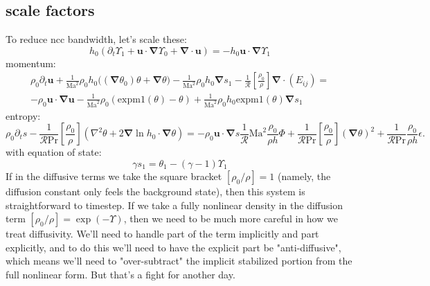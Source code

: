 \documentclass{aastex631}
\newcommand{\del}{\nabla}
\renewcommand{\vec}{\boldsymbol}
\newcommand{\grad}{\vec{\del}}
\newcommand{\scrR}{\mathcal{R}}
\newcommand{\Ma}{\mathrm{Ma}}
\renewcommand{\Pr}{\mathrm{Pr}}
\newcommand{\expm}{\mathrm{expm1}}
\begin{document}
\subsection{scale factors}
To reduce ncc bandwidth, let's scale these:
\begin{equation}
    h_0 \left(\partial_t \Upsilon_1 + \vec{u}\cdot\grad \Upsilon_0 + \grad \cdot \vec{u}\right) = - h_0 \vec{u}\cdot\grad \Upsilon_1
\end{equation}
momentum:
\begin{multline}
  \rho_0 \partial_t \vec{u}
  + \frac{1}{\Ma^2}\rho_0 h_0 \Bigg((\grad \theta_0)\theta  + \grad \theta \Bigg)
  - \frac{1}{\Ma^2} \rho_0 h_0 \grad s_1
  - \frac{1}{\scrR}\left[\frac{\rho_0}{\rho}\right] \grad \cdot (E_{ij})
  = \\
  -\rho_0 \vec{u}\cdot\grad\vec{u}
  -\frac{1}{\Ma^2} \rho_0 \left(\expm(\theta)-\theta\right)
  + \frac{1}{\Ma^2} \rho_0 h_0 \expm(\theta) \grad s_1
\end{multline}
entropy:
\begin{equation}
  \rho_0 \partial_t s
  - \frac{1}{\scrR \Pr} \left[\frac{\rho_0}{\rho}\right]\left(\nabla^2 \theta + 2 \grad \ln h_0 \cdot \grad \theta \right)
  =
  - \rho_0 \vec{u}\cdot\grad s
  \frac{1}{\scrR} \Ma^2  \frac{\rho_0}{\rho h} \Phi
  + \frac{1}{\scrR \Pr} \left[\frac{\rho_0}{\rho}\right] (\grad \theta)^2
  + \frac{1}{\scrR \Pr} \frac{\rho_0}{\rho h} \epsilon.
\end{equation}
with equation of state:
\begin{equation}
  \gamma s_1 = \theta_1 - (\gamma - 1)\Upsilon_1
\end{equation}
If in the diffusive terms we take the square bracket $[\rho_0/\rho] = 1$ (namely, the diffusion constant only feels the background state), then this system is straightforward to timestep.  If we take a fully nonlinear density in the diffusion term $[\rho_0/\rho] = \exp(-\Upsilon)$, then we need to be much more careful in how we treat diffusivity.  We'll need to handle part of the term implicitly and part explicitly, and to do this we'll need to have the explicit part be "anti-diffusive", which means we'll need to "over-subtract" the implicit stabilized portion from the full nonlinear form.  But that's a fight for another day.

\newpage
\end{document}
